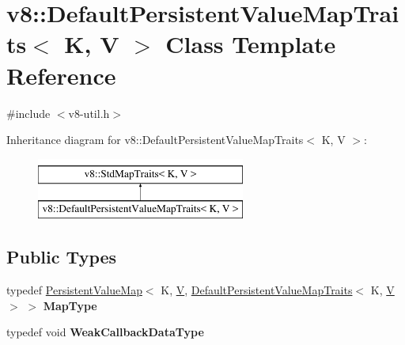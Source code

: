 \hypertarget{classv8_1_1DefaultPersistentValueMapTraits}{}\section{v8\+:\+:Default\+Persistent\+Value\+Map\+Traits$<$ K, V $>$ Class Template Reference}
\label{classv8_1_1DefaultPersistentValueMapTraits}


{\ttfamily \#include $<$v8-\/util.\+h$>$}

Inheritance diagram for v8\+:\+:Default\+Persistent\+Value\+Map\+Traits$<$ K, V $>$\+:\begin{figure}[H]
\begin{center}
\leavevmode
\includegraphics[height=2.000000cm]{classv8_1_1DefaultPersistentValueMapTraits}
\end{center}
\end{figure}
\subsection*{Public Types}
\begin{DoxyCompactItemize}
\item 
\mbox{\label{classv8_1_1DefaultPersistentValueMapTraits_a05cbd536d6bb9ba4949198351e074854}} 
typedef \mbox{\hyperlink{classv8_1_1PersistentValueMap}{Persistent\+Value\+Map}}$<$ K, \mbox{\hyperlink{classV}{V}}, \mbox{\hyperlink{classv8_1_1DefaultPersistentValueMapTraits}{Default\+Persistent\+Value\+Map\+Traits}}$<$ K, \mbox{\hyperlink{classV}{V}} $>$ $>$ {\bfseries Map\+Type}
\item 
\mbox{\label{classv8_1_1DefaultPersistentValueMapTraits_a379f8c42e727a9576fb0954bb0245d8f}} 
typedef void {\bfseries Weak\+Callback\+Data\+Type}
\end{DoxyCompactItemize}
